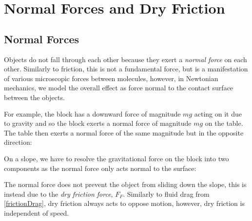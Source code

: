 \documentclass[../main.tex]{subfiles}
\begin{document}
\section{Normal Forces and Dry Friction}
\label{dryFriction}
\subsection{Normal Forces}
Objects do not fall through each other because they exert a \textit{normal force} on each other.
Similarly to friction, this is not a fundamental force, but is a manifestation of various microscopic forces between molecules, however, in Newtonian mechanics, we model the overall effect as force normal to the contact surface between the objects.

For example, the block has a downward force of magnitude $mg$ acting on it due to gravity and so the block exerts a normal force of magnitude $mg$ on the table.
The table then exerts a normal force of the same magnitude but in the opposite direction:
\begin{center}
\end{center}
On a slope, we have to resolve the gravitational force on the block into two components as the normal force only acts normal to the surface:
\begin{center}
\end{center}
The normal force does not prevent the object from sliding down the slope, this is instead due to the \textit{dry friction force}, $F_F$.
Similarly to fluid drag from \cref{frictionDrag}, dry friction always acts to oppose motion, however, dry friction is independent of speed.
\end{document}
